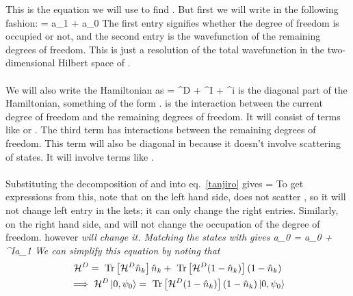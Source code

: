 \documentclass[14pt]{extarticle}
\numberwithin{equation}{section}
\begin{document}
{\eeq
This is the equation we will use to find .
But first we will write \il{\psi} in the following fashion:
\beq
\ket{\psi} = a_1  + a_0
\eeq
The first entry signifies whether the degree of freedom  is occupied or not, and the second entry is the wavefunction of the remaining degrees of freedom.
This is just a resolution of the total wavefunction in the two-dimensional Hilbert space of .\\\\
We will also write the Hamiltonian \il{\ham} as
\beq[ham]
\ham = \ham^D + \ham^I + \ham^i 
\eeq
{} is the diagonal part of the Hamiltonian, something of the form .
 is the interaction between the current degree of freedom  and the remaining degrees of freedom.
It will consist of terms like  or .
The third term  has interactions between the remaining degrees of freedom.
This term will also be diagonal in  because it doesn't involve scattering of  states.
It will involve terms like .
\\\\
Substituting the decomposition of \il{\ket{\psi}} and \ham into eq.~\ref{tanjiro} gives
\beq[zenitsu]
\ol \ham {} = 
\eeq
To get expressions from this, note that on the left hand side, \il{\ol \ham} does not scatter , so it will not change left entry in the kets; it can only change the right entries.
Similarly, on the right hand side,  and  will not change the occupation of the  degree of freedom.
 however \it{will} change it.
Matching the states with  gives
\beq
\ol \ham a_0 = a_0 + \ham^Ia_1
\eeq
We can simplify this equation by noting that
\begin{gather}
\mathcal{H}^D = \text{ Tr} \left[{\mathcal{H}^D \hat n_k}\right]\hat n_k + \text{ Tr} \left[{\mathcal{H}^D (1 - \hat n_k)}\right](1-\hat n_k)\\
 \implies  \mathcal{H}^D \ket{0,\psi_0} = \text{ Tr} \left[{\mathcal{H}^D (1 - \hat n_k)}\right](1-\hat n_k)\ket{0,\psi_0}
\end{gather}
}
\end{document}

